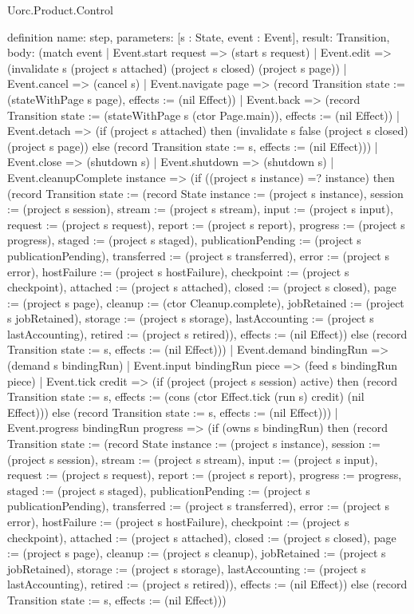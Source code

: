 \begin{lexlean}{Uorc.Product.Control}
\begin{semanticmodule}
definition{
  name: step,
  parameters: [s : State, event : Event],
  result: Transition,
  body: (match event
    | Event.start request => (start s request)
    | Event.edit => (invalidate s (project s attached) (project s closed) (project s page))
    | Event.cancel => (cancel s)
    | Event.navigate page => (record Transition {state := (stateWithPage s page), effects := (nil Effect)})
    | Event.back => (record Transition {state := (stateWithPage s (ctor Page.main)), effects := (nil Effect)})
    | Event.detach => (if (project s attached) then (invalidate s false (project s closed) (project s page)) else (record Transition {state := s, effects := (nil Effect)}))
    | Event.close => (shutdown s)
    | Event.shutdown => (shutdown s)
    | Event.cleanupComplete instance => (if ((project s instance) =? instance) then (record Transition {state := (record State {instance := (project s instance), session := (project s session), stream := (project s stream), input := (project s input), request := (project s request), report := (project s report), progress := (project s progress), staged := (project s staged), publicationPending := (project s publicationPending), transferred := (project s transferred), error := (project s error), hostFailure := (project s hostFailure), checkpoint := (project s checkpoint), attached := (project s attached), closed := (project s closed), page := (project s page), cleanup := (ctor Cleanup.complete), jobRetained := (project s jobRetained), storage := (project s storage), lastAccounting := (project s lastAccounting), retired := (project s retired)}), effects := (nil Effect)}) else (record Transition {state := s, effects := (nil Effect)}))
    | Event.demand bindingRun => (demand s bindingRun)
    | Event.input bindingRun piece => (feed s bindingRun piece)
    | Event.tick credit => (if (project (project s session) active) then (record Transition {state := s, effects := (cons (ctor Effect.tick (run s) credit) (nil Effect))}) else (record Transition {state := s, effects := (nil Effect)}))
    | Event.progress bindingRun progress => (if (owns s bindingRun) then (record Transition {state := (record State {instance := (project s instance), session := (project s session), stream := (project s stream), input := (project s input), request := (project s request), report := (project s report), progress := progress, staged := (project s staged), publicationPending := (project s publicationPending), transferred := (project s transferred), error := (project s error), hostFailure := (project s hostFailure), checkpoint := (project s checkpoint), attached := (project s attached), closed := (project s closed), page := (project s page), cleanup := (project s cleanup), jobRetained := (project s jobRetained), storage := (project s storage), lastAccounting := (project s lastAccounting), retired := (project s retired)}), effects := (nil Effect)}) else (record Transition {state := s, effects := (nil Effect)}))
}
\end{semanticmodule}
\end{lexlean}
